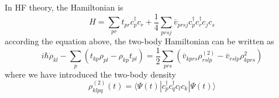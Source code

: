   In HF theory, the Hamiltonian is
  \begin{equation}
    H = \sum_{pr}t_{pr} c_p^\dagger c_r + \frac{1}{4}\sum_{prsj}\bar{v}_{prsj}c_p^\dagger c_r^\dagger c_j c_s \label{tdhf5}
  \end{equation}
  according the equation above, the two-body Hamiltonian can be written as
  \begin{equation}
    i\hbar\dot{\rho}_{kl} - \sum_{p}(t_{kp}\rho_{pl}-\rho_{kp}t_{pl}) = \frac{1}{2}\sum_{prs} \left(\bar{v}_{kprs}\rho_{rslp}^{(2)} - \bar{v}_{rslp}\rho_{kprs}^{2}\right) \label{tdhf6}
  \end{equation}
  where we have introduced the two-body density
  \begin{equation}
    \rho_{klpq}^{(2)}(t) = \langle \Psi(t) | c_p^\dagger c_q^\dagger c_l c_k | \Psi(t) \rangle  \label{tdhf7}
  \end{equation}
